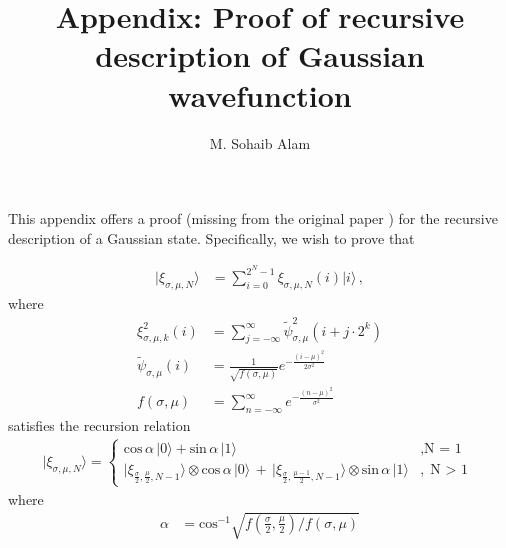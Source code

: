 \documentclass[11pt]{article}
\begin{document}
 


\title{Appendix: Proof of recursive description of Gaussian wavefunction}
\date{\vspace{-5ex}}
\author{M. Sohaib Alam}
\maketitle

\noindent This appendix offers a proof (missing from the original paper ) for the recursive description of a Gaussian state. Specifically, we wish to prove that

\begin{align*}
\vert \xi_{\sigma, \mu, N} \rangle &= \sum_{i=0}^{2^N - 1} \xi_{\sigma, \mu, N} (i) \vert i \rangle\, , \nonumber
\end{align*}
where
\begin{align*}
\xi_{\sigma, \mu, k}^{2} (i) &= \sum_{j=-\infty}^{\infty} \tilde{\psi}_{\sigma, \mu}^{2} (i + j \cdot 2^{k}) \\
\tilde{\psi}_{\sigma, \mu} (i) &= \frac{1}{\sqrt{f(\sigma, \mu)}} e^{-\frac{(i-\mu)^2}{2\sigma^2}} \\
f(\sigma, \mu) &= \sum_{n=-\infty}^{\infty} e^{-\frac{(n-\mu)^2}{\sigma^2}}
\end{align*}
satisfies the recursion relation
\begin{align}
\vert \xi_{\sigma, \mu, N} \rangle = \left\{ \begin{array}{ll}
\text{cos} \, \alpha \, \vert 0 \rangle + \text{sin} \, \alpha \, \vert 1 \rangle &, \text{N = 1} \\
  \vert \xi_{\frac{\sigma}{2}, \frac{\mu}{2}, N-1} \rangle \otimes \text{cos} \, \alpha \, \vert 0 \rangle \, + \,   \vert \xi_{\frac{\sigma}{2}, \frac{\mu-1}{2}, N-1} \rangle \otimes \text{sin} \, \alpha \, \vert 1 \rangle &, \text{N $>$ 1} 
\end{array} \right. \label{eq1}
\end{align}
where
\begin{align*}
\alpha &= \text{cos}^{-1} \sqrt{f\left( \frac{\sigma}{2}, \frac{\mu}{2} \right) / f(\sigma, \mu)}
\end{align*}
\end{document}
